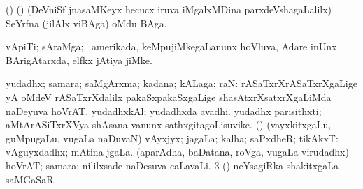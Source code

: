 {\bentry
{} 
\gl{\nA}
\expl{}
\bmng
(\birx) (\ca) (DeVniSf jnasaMKeyx hecucx iruva iMgalxMDina parxdeVshagaLalilx) SeYrfna (jilAlx viBAga) oMdu BAga. 
\emng
\eentry

\bentry
{} 
\gl{\nA}
\bmng
vApiTi; sAraMga; \kanu\ amerikada, keMpujiMkegaLanunx hoVluva, Adare inUnx BArigAtarxda, elfkx jAtiya jiMke. 
\emng
\eentry

\bentry
{} 
\gl{\nA}
\expl{}
\bmng
\bnum
{} yudadhx; samara; saMgArxma; kadana; kALaga; raN: 
\banum
{} rASaTxrXrASaTxrXgaLige yA oMdeV rASaTxrXdalilx pakaSxpakaSxgaLige shasAtxrXsatxrXgaLiMda naDeyuva hoVrAT. 
 yudadhxkAl; yudadhxda avadhi. 
 yudadhx parisithxti; aMtArASiTxrXVya shAsana \mo vanunx sathxgitagoLisuvike. 
\eanum
\numie
{} (\rUpa) 
\banum
{} (vayxkitxgaLu, guMpugaLu, \mo vugaLa naDuvaN) vAyxjyx; jagaLa; kalha; saPxdheR; tikAkxT:  vAguyxdadhx; mAtina jgaLa. 
 (aparAdha, baDatana, roVga, \mo vugaLa virudadhx) hoVrAT; samara; nililxsade naDesuva caLavaLi. 
\eanum
\numie
\num{3} (\rUpa) neYsagiRka shakitxgaLa saMGaSaR. 
\enum
\emng

}

